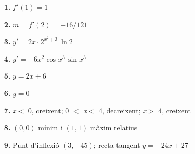 \documentclass[a4paper, pdf, twoside]{book}
\begin{document}
\begin{enumerate}
\vspace{0.25cm}
\item[\fontfamily{phv}\selectfont\color{blue}\textbf{1. }]  \scalebox{0.6}{\simbolclau } 
$f'(1)=1$
\vspace{0.25cm}
\item[\fontfamily{phv}\selectfont\color{blue}\textbf{2. }]  \scalebox{0.6}{\simbolclau } 
$m=f'(2)=-16/121$
\vspace{0.25cm}
\item[\fontfamily{phv}\selectfont\color{blue}\textbf{3. }]  \scalebox{0.6}{\simbolclau } 
$y'=2x \cdot 2^{x^2+3} \, \ln 2$ 
\vspace{0.25cm}
\item[\fontfamily{phv}\selectfont\color{blue}\textbf{4. }]  \scalebox{0.6}{\simbolclau } 
$y'=-6x^2\cos x^3 \, \sin x^3 $
\vspace{0.25cm}
\item[\fontfamily{phv}\selectfont\color{blue}\textbf{5. }]  \scalebox{0.6}{\simbolclau } 
$y = 2x + 6$
\vspace{0.25cm}
\item[\fontfamily{phv}\selectfont\color{blue}\textbf{6. }]  \scalebox{0.6}{\simbolclau } 
$y=0$
\vspace{0.25cm}
\item[\fontfamily{phv}\selectfont\color{blue}\textbf{7. }]  \scalebox{0.6}{\simbolclau } 
\textit {x}$<$ 0, creixent; 0 $<$ \textit {x}$<$ 4, decreixent; \textit {x}$>$ 4, creixent
\vspace{0.25cm}
\item[\fontfamily{phv}\selectfont\color{blue}\textbf{8. }]  \scalebox{0.6}{\simbolclau } 
$(0, 0)$ mínim i $(1, 1)$ màxim relatius
\vspace{0.25cm}
\item[\fontfamily{phv}\selectfont\color{blue}\textbf{9. }]  \scalebox{0.6}{\simbolclau } 
Punt d'inflexió $(3, -45)$; recta tangent $y=-24x+27$
 \end{enumerate}
\end{document}
